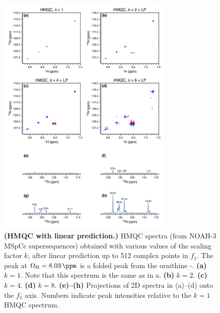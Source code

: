 \begin{figure}
    \centering
    \includegraphics[width=0.75\textwidth]{./figures/hmqc_kscale_lp.png}
    \caption{
        \textbf{(HMQC with linear prediction.)}
        \nitrogen{} HMQC spectra (from NOAH-3 MSpCc supersequences) obtained with various values of the scaling factor $k$, after linear prediction up to 512 complex points in $f_1$.
        The peak at $\Omega_{\ce{H}} = \SI{8.03}{\ppm}$ is a folded peak from the ornithine \textdelta-.
        \textbf{(a)} $k = 1$. Note that this spectrum is the same as in a.
        \textbf{(b)} $k = 2$.
        \textbf{(c)} $k = 4$.
        \textbf{(d)} $k = 8$.
        \textbf{(e)--(h)} Projections of 2D spectra in (a)--(d) onto the $f_1$ axis.
        Numbers indicate peak intensities relative to the $k = 1$ HMQC spectrum.
        \grami{}
    }
    \label{fig:hmqc_kscale_lp}
\end{figure}

